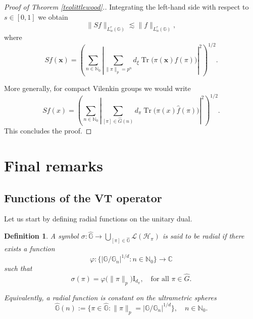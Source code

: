 \documentclass[12pt, reqno]{amsart}
\newtheorem{defi}{Definition}[section]
\newcommand{\1}{\mathds{1}}
\newcommand{\G}{\mathbb{G}}
\begin{document}
\begin{proof}[Proof of Theorem \ref{teolittlewood}.]
Integrating the left-hand side with respect to $s \in [0,1]$ we obtain
\[
\|Sf\|_{L^r_\alpha(\G)}
\lesssim
\|f\|_{L^r_\alpha(\G)},
\]
where
\[
Sf(\mathbf{x})
=
\left(
\sum_{n \in \mathbb{N}_0}
\left|
\sum_{\|\pi\|_p = p^n}
d_\xi 
\operatorname{Tr}
\big(
\pi(\mathbf{x})\widehat{f}(\pi)
\big)
\right|^2
\right)^{1/2}.
\]

More generally, for compact Vilenkin groups we would write \[
Sf(x)
=
\left(
\sum_{n \in \mathbb{N}_0}
\left|
\sum_{[\pi] \in \widehat{G}(n)}
d_\pi
\operatorname{Tr}
\big(
\pi(x)\widehat{f}(\pi)
\big)
\right|^2
\right)^{1/2}.
\]
This concludes the proof.
\end{proof}



\section{Final remarks}

\subsection{Functions of the VT operator}

Let us start by defining radial functions on the unitary dual.

\begin{defi}\normalfont
A symbol \(\sigma : \widehat{\G} \to \bigcup_{[\pi] \in \widehat{\G}} \mathcal{L}(\mathcal{H}_\pi)\) is said to be \emph{radial} if there exists a function
\[
\varphi : \{|\G / \G_n|^{1/d} : n \in \mathbb{N}_0\} \to \mathbb{C}
\]
such that
\[
\sigma(\pi) = \varphi\big(\|\pi\|_p\big) \mathrm{I}_{d_\pi}, \quad \text{for all } \pi \in \widehat{G}.
\]

Equivalently, a radial function is constant on the ultrametric spheres
\[\widehat{\G}(n):=
\{\pi \in \widehat{\G} : \|\pi\|_p = |\G / \G_n|^{1/d}\}, \quad n \in \mathbb{N}_0.
\]
\end{defi}
\end{document}
